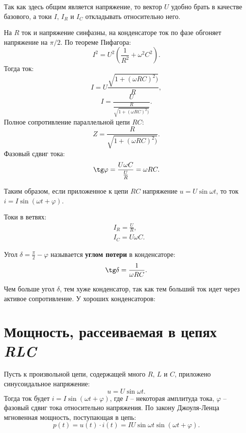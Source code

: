 	\begin{solution}
	
        Так как здесь общим является напряжение, то вектор \( U \) удобно брать
        в качестве базового, а токи \( I \), \( I_R \) и \( I_C \) откладывать
        относительно него.
        
        На \( R \) ток и напряжение синфазны, на конденсаторе ток по фазе
        обгоняет напряжение на \( \pi/2 \). По теореме Пифагора:
        \[
            I^2 = U^2\left(\frac{1}{R^2} + \omega^2C^2\right).
        \]
        Тогда ток:
        \[
            I = U\frac{\sqrt{1 + (\omega RC)^2)}}{R},
        \]
        \[
            I = \frac{U}{\frac{R}{\sqrt{1 + (\omega RC)^2)}}}.
        \]
        Полное сопротивление параллельной цепи \( RC \):
        \[
            Z = \frac{R}{\sqrt{1 + (\omega RC)^2)}}.
        \]
        Фазовый сдвиг тока:
        \[
            \tg\varphi = \frac{U\omega C}{\frac{U}{R}} = \omega RC.
        \]

        Таким образом, если приложенное к цепи \( RC \) напряжение
        \( u = U\sin\omega t \), то ток \( i = I\sin(\omega t + \varphi)\).
        
        Токи в ветвях:
        \begin{align*}
            & I_R = \frac{U}{R}, \\
            & I_C = U\omega C.
        \end{align*} 
	\end{solution}
	
	Угол \( \delta = \frac{\pi}{2} - \varphi \) называется \textbf{углом потери}
    в конденсаторе:
	\[
        \tg\delta = \frac{1}{\omega RC}.
    \]
	
	Чем больше угол \( \delta \), тем хуже конденсатор, так как тем больший ток
    идет через активое сопротивление. У хороших конденсаторов:
	
\section{Мощность, рассеиваемая в цепях \textit{RLC}}

	Пусть к произвольной цепи, содержащей много \( R \), \( L \) и \( C \),
    приложено синусоидальное напряжение:
	\[
        u = U\sin\omega t.
    \]
    Тогда ток будет \( i = I\sin(\omega t + \varphi) \), где \( I \) --
    некоторая амплитуда тока, \( \varphi \) -- фазовый сдвиг тока относительно
    напряжения. По закону Джоуля-Ленца мгновенная мощность, поступающая в цепь:
	\[
        p(t) = u(t)\cdot i(t) = IU\sin\omega t\sin(\omega t + \varphi).
    \]
	
